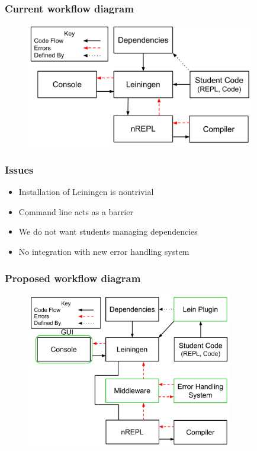 \documentclass{beamer}
\begin{document}
\begin{frame}[fragile]
\frametitle{Current workflow diagram}
\begin{figure}[h]
 \includegraphics[width=10cm]{../CurrentErrorHandling.pdf}
 \centering
\end{figure}
\end{frame}

\begin{frame}
\frametitle{Issues}
	\begin{itemize}
		\item Installation of Leiningen is nontrivial
		\item Command line acts as a barrier
		\item We do not want students managing dependencies
		\item No integration with new error handling system
	\end{itemize} 
\end{frame}

\begin{frame}[fragile]
\frametitle{Proposed workflow diagram}
\begin{figure}[h]
 \includegraphics[width=9cm]{../OurErrorHandlingSystem.pdf}
 \centering
\end{figure}
\end{frame}
\end{document}
